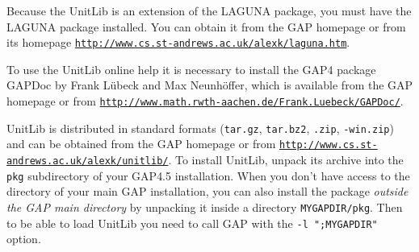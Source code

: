 \documentclass[a4paper,11pt]{report}
\begin{document}
{{ Because the \textsf{UnitLib} is an extension of the \textsf{LAGUNA} package, you must have the \textsf{LAGUNA} package installed. You can obtain it from the \textsf{GAP} homepage or from its homepage \href{http://www.cs.st-andrews.ac.uk/~alexk/laguna.htm} {\texttt{http://www.cs.st-andrews.ac.uk/\texttt{}alexk/laguna.htm}}. 

 To use the \textsf{UnitLib} online help it is necessary to install the \textsf{GAP}4 package \textsf{GAPDoc} by Frank L{\"u}beck and Max Neunh{\"o}ffer, which is available from the \textsf{GAP} homepage or from \href{http://www.math.rwth-aachen.de/~Frank.Luebeck/GAPDoc/} {\texttt{http://www.math.rwth-aachen.de/\texttt{}Frank.Luebeck/GAPDoc/}}. 

 \textsf{UnitLib} is distributed in standard formats (\texttt{tar.gz}, \texttt{tar.bz2}, \texttt{.zip}, \texttt{-win.zip}) and can be obtained from the \textsf{GAP} homepage or from \href{http://www.cs.st-andrews.ac.uk/~alexk/unitlib/} {\texttt{http://www.cs.st-andrews.ac.uk/\texttt{}alexk/unitlib/}}. To install \textsf{UnitLib}, unpack its archive into the \texttt{pkg} subdirectory of your \textsf{GAP}4.5 installation. When you don't have access to the directory of your main \textsf{GAP} installation, you can also install the package \emph{outside the \textsf{GAP} main directory} by unpacking it inside a directory \texttt{MYGAPDIR/pkg}. Then to be able to load \textsf{UnitLib} you need to call \textsf{GAP} with the \texttt{-l ";MYGAPDIR"} option. 

 }

 }

 
\end{document}
